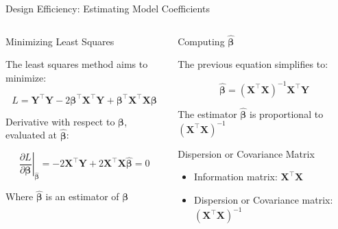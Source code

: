 \documentclass[10pt, compress, aspectratio=169, xcolor={table,usenames,dvipsnames}]{beamer}
\begin{document}
\begin{frame}[label={sec:org0b6d18f}]{Design Efficiency: Estimating Model Coefficients}
\addtocounter{framenumber}{-1}
\begin{columns}
\begin{column}{0.5\columnwidth}
\begin{block}{Minimizing Least Squares}
\vspace{.2cm}

The \alert{least squares method} aims to minimize:
\vspace{-.8cm}
\begin{center}
\begin{equation*}
L = \bm{Y}^{\intercal}\bm{Y} - 2\bm{\beta}^{\intercal}\bm{X}^{\intercal}\bm{Y} +
\bm{\beta}^{\intercal}\bm{X}^{\intercal}\bm{X\beta}
\end{equation*}
\end{center}

\alert{Derivative} with respect to \(\bm{\beta}\), \alert{evaluated} at \(\bm{\hat{\beta}}\):
\vspace{-.7cm}
\begin{center}
\begin{equation*}
\left. \dfrac{\partial{}L}{\partial{}\bm{\beta}}\right|_{\bm{\hat{\beta}}} =
- 2\bm{X}^{\intercal}\bm{Y} + 2\bm{X}^{\intercal}\bm{X\hat{\beta}} = 0
\end{equation*}
\end{center}
Where \(\bm{\hat{\beta}}\) is an \alert{estimator} of \(\bm{\beta}\)
\end{block}
\end{column}
\begin{column}{0.5\columnwidth}
\begin{block}{Computing \(\bm{\hat{\beta}}\)}
\vspace{.2cm}

The previous equation simplifies to:
\vspace{-.8cm}
\begin{center}
\begin{equation*}
\bm{\hat{\beta}} = \left(\bm{X}^{\intercal}\bm{X}\right)^{-1}\bm{X}^{\intercal}\bm{Y}
\end{equation*}
\end{center}

\vspace{-.4cm}
\begin{center}
\colorbox{Accent!25}{The estimator \(\bm{\hat{\beta}}\) is proportional to \(\left(\bm{X}^{\intercal}\bm{X}\right)^{-1}\)}
\end{center}
\vspace{.2cm}
\begin{block}{Dispersion or Covariance Matrix}
\begin{itemize}
\item \alert{Information matrix}: \(\bm{X}^{\intercal}\bm{X}\)
\item \alert{Dispersion} or \alert{Covariance matrix}: \(\left(\bm{X}^{\intercal}\bm{X}\right)^{-1}\)
\end{itemize}
\end{block}
\end{block}
\end{column}
\end{columns}
\end{frame}
\end{document}
